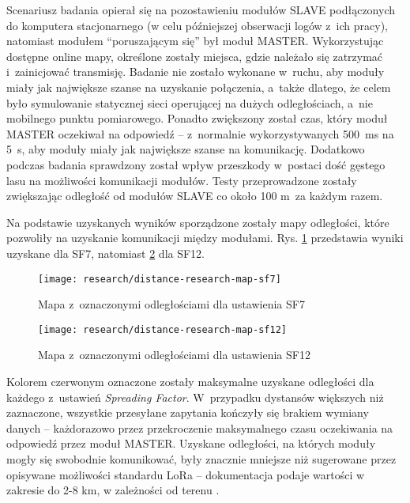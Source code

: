 Scenariusz badania opierał się na pozostawieniu modułów SLAVE podłączonych do komputera stacjonarnego (w celu
późniejszej obserwacji logów z~ich pracy), natomiast modułem \enquote{poruszającym się} był moduł MASTER. Wykorzystując
dostępne online mapy, określone zostały miejsca, gdzie należało się zatrzymać i~zainicjować transmisję. Badanie nie
zostało wykonane w~ruchu, aby moduły miały jak największe szanse na uzyskanie połączenia, a~także dlatego, że celem było
symulowanie statycznej sieci operującej na dużych odległościach, a~nie mobilnego punktu pomiarowego. Ponadto zwiększony
został czas, który moduł MASTER oczekiwał na odpowiedź -- z~normalnie wykorzystywanych 500~ms na 5~s, aby moduły miały
jak największe szanse na komunikację. Dodatkowo podczas badania sprawdzony został wpływ przeszkody w~postaci dość
gęstego lasu na możliwości komunikacji modułów. Testy przeprowadzone zostały zwiększając odległość od modułów SLAVE co
około 100 m~za każdym razem.

Na podstawie uzyskanych wyników sporządzone zostały mapy odległości, które pozwoliły na uzyskanie komunikacji między
modułami. Rys. \ref{img:distance-research-map-sf7} przedstawia wyniki uzyskane dla SF7, natomiast
\ref{img:distance-research-map-sf12} dla SF12.

\begin{figure}[!htbp]
    \centering
    \texttt{[image: research/distance-research-map-sf7]}
    \caption{\label{img:distance-research-map-sf7}Mapa z~oznaczonymi odległościami dla ustawienia SF7}
\end{figure}

\begin{figure}[!htbp]
    \centering
    \texttt{[image: research/distance-research-map-sf12]}
    \caption{\label{img:distance-research-map-sf12}Mapa z~oznaczonymi odległościami dla ustawienia SF12}
\end{figure}

\FloatBarrier
Kolorem czerwonym oznaczone zostały maksymalne uzyskane odległości dla każdego z~ustawień \textsl{Spreading Factor}. W~przypadku
dystansów większych niż zaznaczone, wszystkie przesyłane zapytania kończyły się brakiem wymiany danych -- każdorazowo
przez przekroczenie maksymalnego czasu oczekiwania na odpowiedź przez moduł MASTER. Uzyskane odległości, na których
moduły mogły się swobodnie komunikować, były znacznie mniejsze niż sugerowane przez opisywane możliwości standardu LoRa
-- dokumentacja podaje wartości w zakresie do 2-8 km, w zależności od terenu \cite{semtech-lora-lorawan}.

